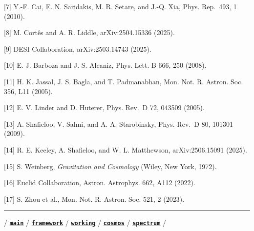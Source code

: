 {[}7{]} Y.-F. Cai, E. N. Saridakis, M. R. Setare, and J.-Q. Xia, Phys.
Rep.~493, 1 (2010).

{[}8{]} M. Cortês and A. R. Liddle, arXiv:2504.15336 (2025).

{[}9{]} DESI Collaboration, arXiv:2503.14743 (2025).

{[}10{]} E. J. Barboza and J. S. Alcaniz, Phys. Lett. B 666, 250 (2008).

{[}11{]} H. K. Jassal, J. S. Bagla, and T. Padmanabhan, Mon. Not. R.
Astron. Soc. 356, L11 (2005).

{[}12{]} E. V. Linder and D. Huterer, Phys. Rev.~D 72, 043509 (2005).

{[}13{]} A. Shafieloo, V. Sahni, and A. A. Starobinsky, Phys. Rev.~D 80,
101301 (2009).

{[}14{]} R. E. Keeley, A. Shafieloo, and W. L. Matthewson,
arXiv:2506.15091 (2025).

{[}15{]} S. Weinberg, \emph{Gravitation and Cosmology} (Wiley, New York,
1972).

{[}16{]} Euclid Collaboration, Astron. Astrophys. 662, A112 (2022).

{[}17{]} S. Zhou et al., Mon. Not. R. Astron. Soc. 521, 2 (2023).

\begin{center}\rule{0.5\linewidth}{0.5pt}\end{center}

/ \textbf{\href{../../../README.md}{\texttt{main}}} /
\textbf{\href{../../framework/}{\texttt{framework}}} /
\textbf{\href{../}{\texttt{working}}} /
\textbf{\href{../../cosmos/}{\texttt{cosmos}}} /
\textbf{\href{../../spectrum/}{\texttt{spectrum}}} /
